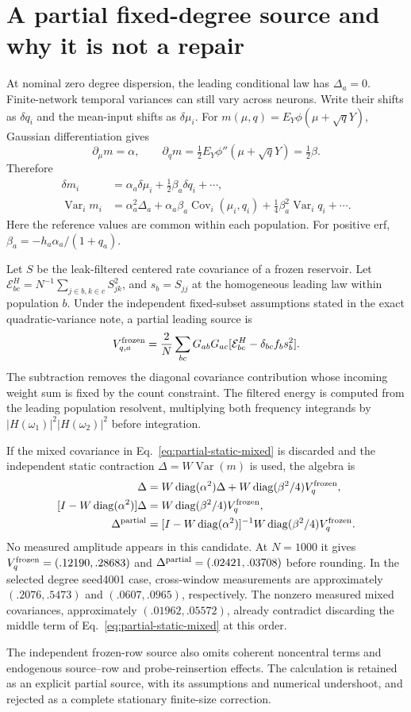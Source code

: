 \section{A partial fixed-degree source and why it is not a repair}
At nominal zero degree dispersion, the leading conditional law has
$\Delta_a=0$. Finite-network temporal variances can still vary across neurons.
Write their shifts as $\delta q_i$ and the mean-input shifts as $\delta\mu_i$.
For $m(\mu,q)=E_Y\phi(\mu+\sqrt qY)$, Gaussian differentiation gives
\begin{equation}
 \partial_\mu m=\alpha,\qquad
 \partial_q m=\tfrac12 E_Y\phi''(\mu+\sqrt qY)=\tfrac12\beta.
\end{equation}
Therefore
\begin{align}
 \delta m_i&=\alpha_a\delta\mu_i+\tfrac12\beta_a\delta q_i+\cdots,\\
 \operatorname{Var}_i m_i
 &=\alpha_a^2\Delta_a+\alpha_a\beta_a
     \operatorname{Cov}_i(\mu_i,q_i)
       +\tfrac14\beta_a^2\operatorname{Var}_i q_i+\cdots.
 \label{eq:partial-static-mixed}
\end{align}
Here the reference values are common within each population. For positive erf,
$\beta_a=-h_a\alpha_a/(1+q_a)$.

Let $S$ be the leak-filtered centered rate covariance of a frozen reservoir.
Let $\mathcal E^H_{bc}=N^{-1}\sum_{j\in b,k\in c}S_{jk}^2$, and $s_b=S_{jj}$
at the homogeneous leading law within population $b$. Under the independent
fixed-subset assumptions stated in the exact quadratic-variance note, a partial
leading source is
\begin{equation}
 V_{q,a}^{\rm frozen}=\frac2N\sum_{bc}G_{ab}G_{ac}
 [\mathcal E^H_{bc}-\delta_{bc}f_bs_b^2].
 \label{eq:partial-vq}
\end{equation}
The subtraction removes the diagonal covariance contribution whose incoming
weight sum is fixed by the count constraint. The filtered energy is computed
from the leading population resolvent, multiplying both frequency integrands
by $|H(\omega_1)|^2|H(\omega_2)|^2$ before integration.

If the mixed covariance in Eq.~\eqref{eq:partial-static-mixed} is discarded
and the independent static contraction $\Delta=W\operatorname{Var}(m)$ is
used, the algebra is
\begin{align}
 \Delta&=W\operatorname{diag}(\alpha^2)\Delta
       +W\operatorname{diag}(\beta^2/4)V_q^{\rm frozen},\\
 [I-W\operatorname{diag}(\alpha^2)]\Delta
       &=W\operatorname{diag}(\beta^2/4)V_q^{\rm frozen},\\
 \Delta^{\rm partial}
       &=[I-W\operatorname{diag}(\alpha^2)]^{-1}
         W\operatorname{diag}(\beta^2/4)V_q^{\rm frozen}.
\end{align}
No measured amplitude appears in this candidate. At $N=1000$ it gives
$V_q^{\rm frozen}=(.12190,.28683)$ and
$\Delta^{\rm partial}=(.02421,.03708)$ before rounding. In the selected
degree seed4001 case, cross-window measurements are approximately
$(.2076,.5473)$ and $(.0607,.0965)$, respectively. The nonzero measured mixed
covariances, approximately $(.01962,.05572)$, already contradict discarding
the middle term of Eq.~\eqref{eq:partial-static-mixed} at this order.

The independent frozen-row source also omits coherent noncentral terms and
endogenous source--row and probe-reinsertion effects. The calculation is
retained as an explicit partial source, with its assumptions and numerical
undershoot, and rejected as a complete stationary finite-size correction.
